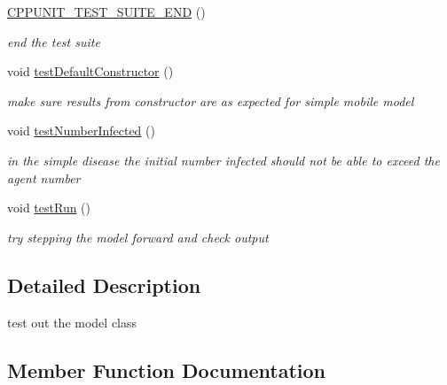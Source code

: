 \begin{DoxyCompactItemize}
\mbox{\label{classmodelTest_a704621b184dbdb454d4cf0f90d4d210c}} 
\mbox{\hyperlink{classmodelTest_a704621b184dbdb454d4cf0f90d4d210c}{C\+P\+P\+U\+N\+I\+T\+\_\+\+T\+E\+S\+T\+\_\+\+S\+U\+I\+T\+E\+\_\+\+E\+ND}} ()
\begin{DoxyCompactList}\small\item\em end the test suite \end{DoxyCompactList}\item 
\mbox{\label{classmodelTest_a1ec93676ece4bbb6f98cf65340472939}} 
void \mbox{\hyperlink{classmodelTest_a1ec93676ece4bbb6f98cf65340472939}{test\+Default\+Constructor}} ()
\begin{DoxyCompactList}\small\item\em make sure results from constructor are as expected for simple mobile model \end{DoxyCompactList}\item 
void \mbox{\hyperlink{classmodelTest_ab7a0f9094aaab12eadc0fedbb57505e8}{test\+Number\+Infected}} ()
\begin{DoxyCompactList}\small\item\em in the simple disease the initial number infected should not be able to exceed the agent number \end{DoxyCompactList}\item 
void \mbox{\hyperlink{classmodelTest_a18ccf91ea0223e52d439fa267665d718}{test\+Run}} ()
\begin{DoxyCompactList}\small\item\em try stepping the model forward and check output \end{DoxyCompactList}\end{DoxyCompactItemize}


\subsection{Detailed Description}
test out the model class 

\subsection{Member Function Documentation}
\mbox{\label{classmodelTest_ab7a0f9094aaab12eadc0fedbb57505e8}} 
